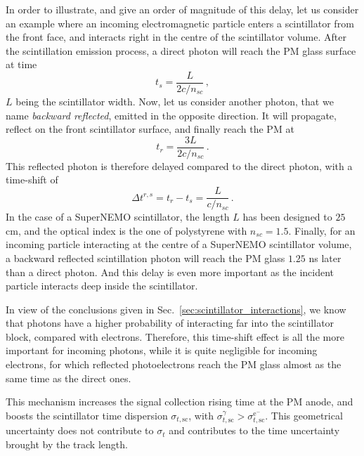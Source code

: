 In order to illustrate, and give an order of magnitude of this delay, let us consider an example where an incoming electromagnetic particle enters a scintillator from the front face, and interacts right in the centre of the scintillator volume.
After the scintillation emission process, a direct photon will reach the PM glass surface at time
\begin{equation}
  t_{s} = \frac{L}{2c/n_{sc}}\,,
\end{equation}
$L$ being the scintillator width.
Now, let us consider another photon, that we name \emph{backward reflected}, emitted in the opposite direction.
It will propagate, reflect on the front scintillator surface, and finally reach the PM at
\begin{equation}
  t_{r} = \frac{3L}{2c/n_{sc}}\,.
\end{equation}
This reflected photon is therefore delayed compared to the direct photon, with a time-shift of
\begin{equation}
  \Delta t^{r,s} = t_{r} - t_{s} = \frac{L}{c/n_{sc}}\,.
\end{equation}
In the case of a SuperNEMO scintillator, the length $L$ has been designed to $25$ cm, and the optical index is the one of polystyrene with $n_{sc}=1.5$.
Finally, for an incoming particle interacting at the centre of a SuperNEMO scintillator volume, a backward reflected scintillation photon will reach the PM glass $1.25$ ns later than a direct photon.
And this delay is even more important as the incident particle interacts deep inside the scintillator.

In view of the conclusions given in Sec.~\ref{sec:scintillator_interactions}, we know that photons have a higher probability of interacting far into the scintillator block, compared with electrons.
Therefore, this time-shift effect is all the more important for incoming photons, while it is quite negligible for incoming electrons, for which reflected photoelectrons reach the PM glass almost as the same time as the direct ones.

This mechanism increases the signal collection rising time at the PM anode, and boosts the scintillator time dispersion $\sigma_{t,\text{sc}}$, with $\sigma_{t,\text{sc}}^{\gamma}>\sigma_{t,\text{sc}}^{\text{e}^{-}}$.
This geometrical uncertainty does not contribute to $\sigma_{t}$ and contributes to the time uncertainty brought by the track length.

